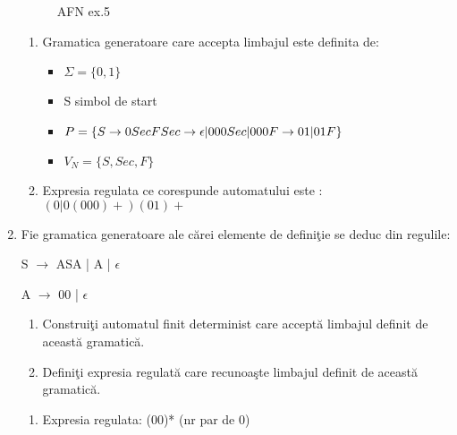 \begin{enumerate}
\begin{figure}[H]
\caption{AFN ex.5}
\end{figure}

\begin{enumerate}
\item Gramatica generatoare care accepta limbajul este definita de:
\begin{itemize}
\item $\Sigma =\{0,1\}$
\item S simbol de start
\item $P=\{ S \rightarrow 0SecF\\
Sec \rightarrow \epsilon|000Sec|000\\
F \rightarrow 01|01F\}$
\item $V_{N}=\{S , Sec , F\}$
\end{itemize}
\item Expresia regulata ce corespunde automatului este : \textbf{$(0|0(000)+)(01)+$}
\end{enumerate}

\item
Fie gramatica generatoare ale cărei elemente de definiţie se deduc din regulile:

S $\rightarrow$ ASA | A | $\epsilon$

A $\rightarrow$ 00 | $\epsilon$

\begin{enumerate}
\item Construiţi automatul finit determinist care acceptă limbajul definit de această gramatică.

\item Definiţi expresia regulată care recunoaşte limbajul definit de această gramatică.
\end{enumerate}

\begin{enumerate}
\item
Expresia regulata: (00)* (nr par de $0$)

\begin{figure}
\centering
\begin{tikzpicture}[shorten >=1pt,node distance=3cm,on grid,auto]


\end{tikzpicture}
\end{figure}
\end{enumerate}
\end{enumerate}
